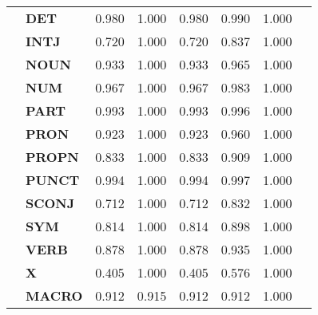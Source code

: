 \begin{longtable}{|l||l||l||l||l||l||l||l|}
\textbf{} & \textbf{DET} & 0.980 & 1.000 & 0.980 & 0.990 & 1.000 \\
\textbf{} & \textbf{INTJ} & 0.720 & 1.000 & 0.720 & 0.837 & 1.000 \\
\textbf{} & \textbf{NOUN} & 0.933 & 1.000 & 0.933 & 0.965 & 1.000 \\
\textbf{} & \textbf{NUM} & 0.967 & 1.000 & 0.967 & 0.983 & 1.000 \\
\textbf{} & \textbf{PART} & 0.993 & 1.000 & 0.993 & 0.996 & 1.000 \\
\textbf{} & \textbf{PRON} & 0.923 & 1.000 & 0.923 & 0.960 & 1.000 \\
\textbf{} & \textbf{PROPN} & 0.833 & 1.000 & 0.833 & 0.909 & 1.000 \\
\textbf{} & \textbf{PUNCT} & 0.994 & 1.000 & 0.994 & 0.997 & 1.000 \\
\textbf{} & \textbf{SCONJ} & 0.712 & 1.000 & 0.712 & 0.832 & 1.000 \\
\textbf{} & \textbf{SYM} & 0.814 & 1.000 & 0.814 & 0.898 & 1.000 \\
\textbf{} & \textbf{VERB} & 0.878 & 1.000 & 0.878 & 0.935 & 1.000 \\
\textbf{} & \textbf{X} & 0.405 & 1.000 & 0.405 & 0.576 & 1.000 \\
\textbf{} & \textbf{MACRO} & 0.912 & 0.915 & 0.912 & 0.912 & 1.000 \\
\cline{1-7}
\end{longtable}
